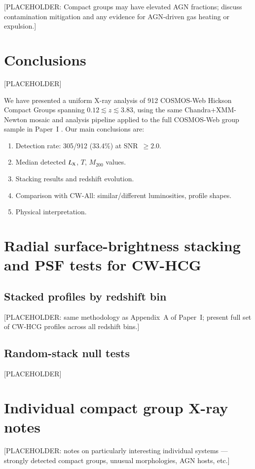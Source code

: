 \documentclass{aa}
\begin{document}
[PLACEHOLDER: Compact groups may have elevated AGN fractions; discuss contamination mitigation and any evidence for AGN-driven gas heating or expulsion.]

\section{Conclusions}
\label{sec:conclusions}

[PLACEHOLDER]

We have presented a uniform X-ray analysis of 912 COSMOS-Web Hickson Compact Groups spanning $0.12 \lesssim z \lesssim 3.83$, using the same Chandra+XMM-Newton mosaic and analysis pipeline applied to the full COSMOS-Web group sample in Paper~I \citep{Gozaliasl2026a}. Our main conclusions are:

\begin{enumerate}
  \item [TBD] Detection rate: 305/912 (33.4\%) at SNR~$\geq 2.0$.
  \item [TBD] Median detected $L_{\rm X}$, $T$, $M_{200}$ values.
  \item [TBD] Stacking results and redshift evolution.
  \item [TBD] Comparison with CW-All: similar/different luminosities, profile shapes.
  \item [TBD] Physical interpretation.
\end{enumerate}

\begin{appendix}

\section{Radial surface-brightness stacking and PSF tests for CW-HCG}

\subsection{Stacked profiles by redshift bin}

[PLACEHOLDER: same methodology as Appendix~A of Paper~I; present full set of CW-HCG profiles across all redshift bins.]

\subsection{Random-stack null tests}

[PLACEHOLDER]

\section{Individual compact group X-ray notes}

[PLACEHOLDER: notes on particularly interesting individual systems --- strongly detected compact groups, unusual morphologies, AGN hosts, etc.]

\end{appendix}
\end{document}
